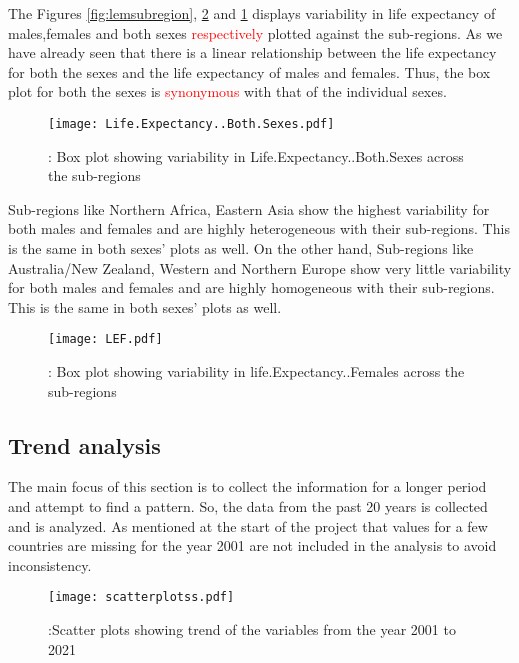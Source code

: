 \documentclass[12 pt]{scrartcl}
\newcommand{\red}{\textcolor{red}}
\begin{document}
	The Figures \ref{fig:lemsubregion}, \ref{fig:lefsubregion} and \ref{fig:lebssubregion} displays variability in life expectancy of males,females and both sexes\red{ respectively} plotted against the sub-regions. As we have already seen that there is a linear relationship between the life expectancy for both the sexes and the life expectancy of males and females. Thus, the box plot for both the sexes is \red{synonymous} with that of the individual sexes.		
	
	\begin{figure}[h!]
		\centering
		\texttt{[image: Life.Expectancy..Both.Sexes.pdf]}
		\caption{: Box plot showing variability in Life.Expectancy..Both.Sexes across the sub-regions}
		\label{fig:lebssubregion}
	\end{figure}
	
	Sub-regions like Northern Africa, Eastern Asia show the highest variability for both males and females and are highly heterogeneous with their sub-regions. This is the same in both sexes' plots as well. On the other hand, Sub-regions like Australia/New Zealand, Western and Northern Europe show very little variability for both males and females and are highly homogeneous with their sub-regions. This is the same in both sexes' plots as well.
	
	\begin{figure}[h!]
		\centering
		\texttt{[image: LEF.pdf]}
		\caption{: Box plot showing variability in life.Expectancy..Females across the sub-regions}
		\label{fig:lefsubregion}
	\end{figure}
	
	\subsection{Trend analysis}
	The main focus of this section is to collect the information for a longer period and attempt to find a pattern. So, the data from the past 20 years is collected and is analyzed. As mentioned at the start of the project that values for a few countries are missing for the year 2001 are not included in the analysis to avoid inconsistency.
	
	\begin{figure}[h!]
		\centering
		\texttt{[image: scatterplotss.pdf]}
		\caption{:Scatter plots showing trend of the variables from the year 2001 to 2021}
		\label{fig:scatterplots}
	\end{figure}
	
\end{document}
